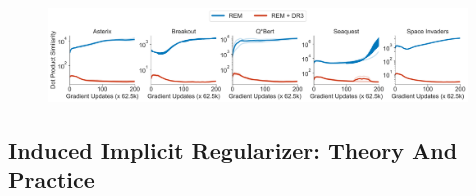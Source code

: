 \begin{figure}[H]
    \centering
    \vspace{-10pt}
    \includegraphics[width=0.99\textwidth]{chapters/dr3/rebuttal/rebuttal_rem_dotproduct_value_final_v2.pdf}
    \vspace{-5pt}
    \caption{\footnotesize{\label{fig:rem_dot_products} }}
    \vspace{-0.3cm}
\end{figure}


\vspace{-0.1cm}
\subsection{Induced Implicit Regularizer: Theory And Practice}
\label{app:theory_practice_gap}
\vspace{-0.1cm}

